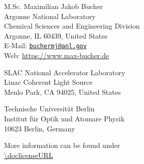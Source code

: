 \begin{flushleft}
{\Large M.Sc. Maximilian Jakob Bucher}\\
\footnotesize{Argonne National Laboratory\\
Chemical Sciences and Engineering Division\\
Argonne, IL 60439, United States\\
E-Mail: \href{mailto:buchermj@anl.gov}{\nolinkurl{buchermj@anl.gov} }\\
Web: \url{https://www.max-bucher.de}}
\vspace{0.5cm}

SLAC National Accelerator Laboratory\\
Linac Coherent Light Source\\
Menlo Park, CA 94025, United States
\vspace{0.5cm}

Technische Universit{\"a}t Berlin\\
Institut f{\"u}r Optik und Atomare Physik\\
10623 Berlin, Germany
\end{flushleft}
\vspace{10cm}
\doclicenseThis
More information can be found under\\
\url{\doclicenseURL}
